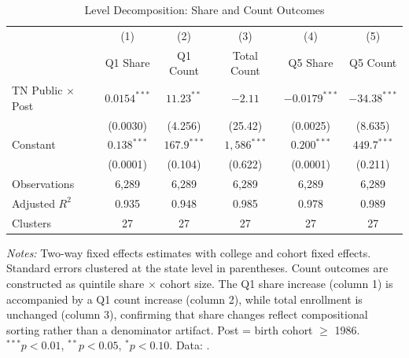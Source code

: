 \begin{table}[H]
\centering
\begin{threeparttable}
\caption{Level Decomposition: Share and Count Outcomes}
\label{tab:level_decomp}
\begin{tabular}{lccccc}
\toprule
 & (1) & (2) & (3) & (4) & (5) \\
 & Q1 Share & Q1 Count & Total Count & Q5 Share & Q5 Count \\
\midrule
TN Public $\times$ Post & $0.0154^{***}$ & $11.23^{**}$ & $-2.11$ & $-0.0179^{***}$ & $-34.38^{***}$ \\
                         & (0.0030) & (4.256) & (25.42) & (0.0025) & (8.635) \\
\addlinespace
Constant                 & $0.138^{***}$ & $167.9^{***}$ & $1{,}586^{***}$ & $0.200^{***}$ & $449.7^{***}$ \\
                         & (0.0001) & (0.104) & (0.622) & (0.0001) & (0.211) \\
\midrule
Observations             & 6,289 & 6,289 & 6,289 & 6,289 & 6,289 \\
Adjusted $R^{2}$         & 0.935 & 0.948 & 0.985 & 0.978 & 0.989 \\
Clusters                 & 27 & 27 & 27 & 27 & 27 \\
\bottomrule
\end{tabular}
\begin{tablenotes}[flushleft]
\footnotesize
\item \textit{Notes:} Two-way fixed effects estimates with college and
  cohort fixed effects. Standard errors clustered at the state level in
  parentheses. Count outcomes are constructed as quintile
  share $\times$ cohort size. The Q1 share increase (column 1) is
  accompanied by a Q1 count increase (column 2), while total enrollment
  is unchanged (column 3), confirming that share changes reflect
  compositional sorting rather than a denominator artifact. Post = birth
  cohort $\geq$ 1986. $^{***}p<0.01$, $^{**}p<0.05$, $^{*}p<0.10$.
  Data: \textcite{chetty2020mobility}.
\end{tablenotes}
\end{threeparttable}
\end{table}
